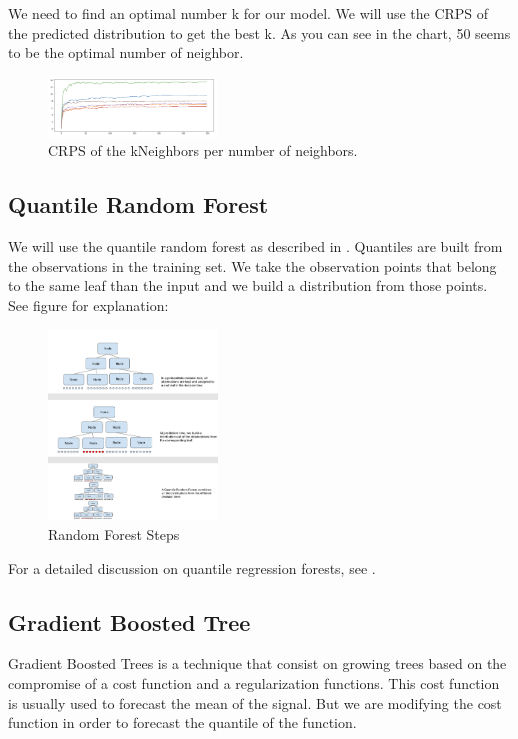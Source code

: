\documentclass[a4paper,twocolumn,5p]{elsarticle}
\begin{document}
We need to find an optimal number k for our model. We will use the CRPS of the predicted distribution
to get the best k. As you can see in the chart, 50 seems to be the optimal 
number of neighbor.

\begin{figure}
  \caption{CRPS of the kNeighbors per number of neighbors.}
  \centering
  \includegraphics[width=0.4\textwidth]{kneighbor_crps}
\end{figure}

\subsection{Quantile Random Forest}

We will use the quantile random forest as described in \cite{randomforestdesc}. Quantiles are built 
from the observations in the training set. We take the observation points that belong to the 
same leaf than the input and we build a distribution from those points. See figure for explanation:

\begin{figure}
  \caption{Random Forest Steps}
  \centering
  \includegraphics[width=0.4\textwidth]{quantile_random_forest}
\end{figure}


For a detailed discussion on quantile regression forests, see
\cite{meinshausen_quantile_2006}.

\subsection{Gradient Boosted Tree}

Gradient Boosted Trees is a technique that consist on growing trees based on the compromise 
of a cost function and a regularization functions. This cost function is usually used to forecast 
the mean of the signal. But we are modifying the cost function 
in order to forecast the quantile of the function. 
\end{document}
